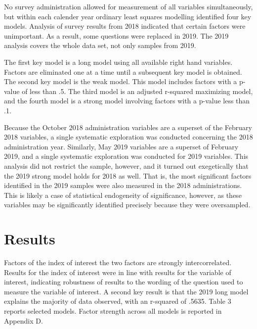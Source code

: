 \documentclass[AER]{./aea-latex-templates/AEA}
\begin{document}
        No survey administration allowed for measurement of all variables simultaneously,
        but within each calender year ordinary least squares modelling identified four key models.
        Analysis of survey results from 2018 indicated that certain factors were unimportant.
        As a result, some questions were replaced in 2019. The 2019 analysis covers the whole data
        set, not only samples from 2019.
        
        The first key model is a long model using all available right hand variables.
        Factors are eliminated one at a time until a subsequent key model is obtained.
        The second key model is the weak model. This model includes factors with a p-value of less than .5.
        The third model is an adjusted r-squared maximizing model, and the fourth
        model is a strong model involving factors with a p-value less than .1.
        
        Because the October 2018 administration variables are a superset of the
        February 2018 variables, a single systematic exploration was conducted
        concerning the 2018 administration year. Similarly, May 2019 variables are
        a superset of February 2019, and a single systematic exploration was
        conducted for 2019 variables. This analysis did not restrict the sample,
        however, and it turned out exegetically that the 2019 strong model holds
        for 2018 as well. That is, the most significant factors identified in the
        2019 samples were also measured in the 2018 administrations. This is
        likely a case of statistical endogeneity of significance, however, as
        these variables may be significantly identified precisely because they
        were oversampled.
        
        \section{Results}
        
        Factors of the index of interest the two factors
        are strongly intercorrelated. Results for the index of interest were in line
        with results for the variable of interest, indicating robustness of results
        to the wording of the question used to measure the variable of interest.
        A second key result is that the 2019 long model explains the majority of data observed, with an r-squared of .5635.
        Table 3 reports selected models. Factor strength across all models is reported in Appendix D.
        
\end{document}
